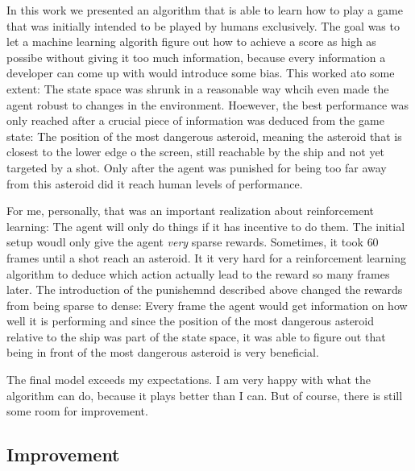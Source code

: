 \documentclass[a4paper,10pt]{article}
\begin{document}
In this work we presented an algorithm that is able to learn how to play a game that was initially intended to be played by humans exclusively.
The goal was to let a machine learning algorith figure out how to achieve a score as high as possibe without giving it too much information, because every information a developer can come up with would introduce some bias.
This worked ato some extent: The state space was shrunk in a reasonable way whcih even made the agent robust to changes in the environment.
Hoewever, the best performance was only reached after a crucial piece of information was deduced from the game state: The position of the most dangerous asteroid, meaning the asteroid that is closest to the lower edge o the screen, still reachable by the ship and not yet targeted by a shot.
Only after the agent was punished for being too far away from this asteroid did it reach human levels of performance.

For me, personally, that was an important realization about reinforcement learning: The agent will only do things if it has incentive to do them.
The initial setup woudl only give the agent \emph{very} sparse rewards. Sometimes, it took $60$ frames until a shot reach an asteroid. 
It it very hard for a reinforcement learning algorithm to deduce which action actually lead to the reward so many frames later.
The introduction of the punishemnd described above changed the rewards from being sparse to dense: Every frame the agent would get information on how well it is performing and since the position of the most dangerous asteroid relative to the ship was part of the state space, it was able to figure out that being in front of the most dangerous asteroid is very beneficial.

The final model exceeds my expectations. I am very happy with what the algorithm can do, because it plays better than I can.
But of course, there is still some room for improvement.
\subsection{Improvement}
\end{document}
